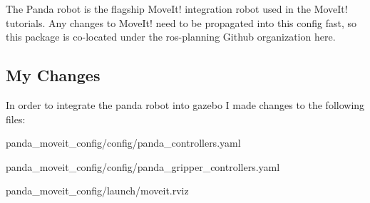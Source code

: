 The Panda robot is the flagship Move\+It! integration robot used in the Move\+It! tutorials. Any changes to Move\+It! need to be propagated into this config fast, so this package is co-\/located under the {\ttfamily ros-\/planning} Github organization here.

\subsection*{My Changes}

In order to integrate the panda robot into gazebo I made changes to the following files\+:


\begin{DoxyItemize}
\item panda\+\_\+moveit\+\_\+config/config/panda\+\_\+controllers.\+yaml
\item panda\+\_\+moveit\+\_\+config/config/panda\+\_\+gripper\+\_\+controllers.\+yaml
\item panda\+\_\+moveit\+\_\+config/launch/moveit.\+rviz 
\end{DoxyItemize}